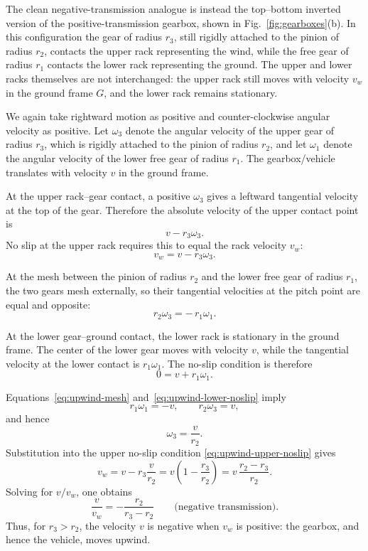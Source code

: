 \documentclass[reprint,aps,pra,longbibliography]{revtex4-2}
\begin{document}
The clean negative-transmission analogue is instead the top--bottom inverted
version of the positive-transmission gearbox, shown in
Fig.~\ref{fig:gearboxes}(b).  In this configuration the gear of radius \(r_3\),
still rigidly attached to the pinion of radius \(r_2\), contacts the upper rack
representing the wind, while the free gear of radius \(r_1\) contacts the lower
rack representing the ground.  The upper and lower racks themselves are not
interchanged: the upper rack still moves with velocity \(v_w\) in the ground
frame \(G\), and the lower rack remains stationary.

We again take rightward motion as positive and counter-clockwise angular
velocity as positive.  Let \(\omega_3\) denote the angular velocity of the
upper gear of radius \(r_3\), which is rigidly attached to the pinion of radius
\(r_2\), and let \(\omega_1\) denote the angular velocity of the lower free
gear of radius \(r_1\).  The gearbox/vehicle translates with velocity \(v\)
in the ground frame.

At the upper rack--gear contact, a positive \(\omega_3\) gives a leftward
tangential velocity at the top of the gear.  Therefore the absolute velocity
of the upper contact point is
\[
v-r_3\omega_3 .
\]
No slip at the upper rack requires this to equal the rack velocity \(v_w\):
\begin{equation}
v_w = v-r_3\omega_3 .
\label{eq:upwind-upper-noslip}
\end{equation}

At the mesh between the pinion of radius \(r_2\) and the lower free gear of
radius \(r_1\), the two gears mesh externally, so their tangential velocities
at the pitch point are equal and opposite:
\begin{equation}
r_2\omega_3 = -\,r_1\omega_1 .
\label{eq:upwind-mesh}
\end{equation}

At the lower gear--ground contact, the lower rack is stationary in the ground
frame.  The center of the lower gear moves with velocity \(v\), while the
tangential velocity at the lower contact is \(r_1\omega_1\).  The no-slip
condition is therefore
\begin{equation}
0 = v+r_1\omega_1 .
\label{eq:upwind-lower-noslip}
\end{equation}

Equations~\eqref{eq:upwind-mesh} and~\eqref{eq:upwind-lower-noslip} imply
\[
r_1\omega_1=-v,
\qquad
r_2\omega_3=v,
\]
and hence
\[
\omega_3=\frac{v}{r_2}.
\]
Substitution into the upper no-slip condition
\eqref{eq:upwind-upper-noslip} gives
\[
v_w
 =
v-r_3\frac{v}{r_2}
 =
v\left(1-\frac{r_3}{r_2}\right)
 =
v\,\frac{r_2-r_3}{r_2}.
\]
Solving for \(v/v_w\), one obtains
\begin{equation}
\frac{v}{v_w}
=
-\frac{r_2}{r_3-r_2}
\qquad\text{(negative transmission).}
\label{eq:upwind-v-vw-ratio}
\end{equation}
Thus, for \(r_3>r_2\), the velocity \(v\) is negative when \(v_w\) is
positive: the gearbox, and hence the vehicle, moves upwind.
\end{document}
